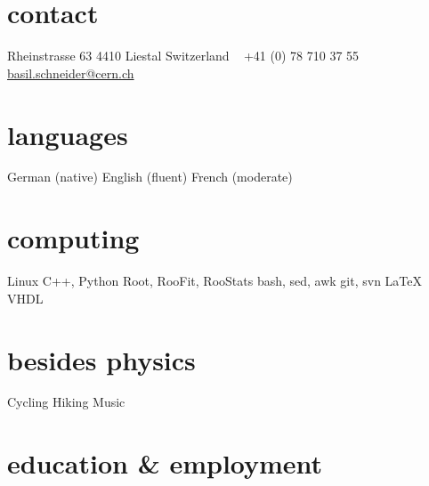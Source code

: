 \documentclass[]{cv} %
\begin{document}


\begin{aside} %
  \section{contact}
  Rheinstrasse 63
  4410 Liestal
  Switzerland
  ~
  +41 (0) 78 710 37 55
  ~
  \href{mailto:basil.schneider@cern.ch}{basil.schneider@cern.ch}
  \section{languages}
  German (native)
  English (fluent)
  French (moderate)
  \section{computing}
  Linux
  C++, Python
  Root, RooFit, RooStats
  bash, sed, awk
  git, svn
  \LaTeX
  VHDL
  \section{besides physics}
  Cycling
  Hiking
  Music
\end{aside}


\section{education \& employment}
\end{document}
